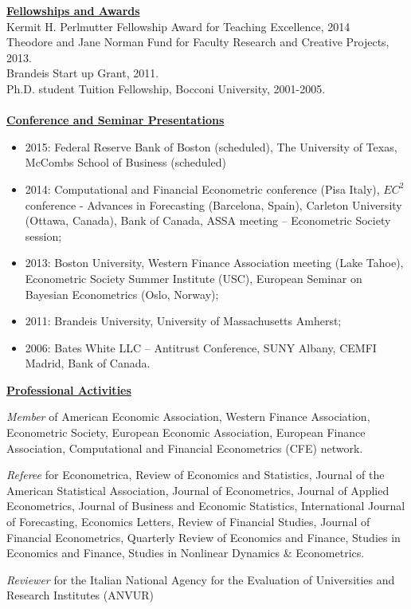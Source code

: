 \documentclass[12pt]{article}
\begin{document}
\underline{\textbf{Fellowships and Awards}}\\
Kermit H. Perlmutter Fellowship Award for Teaching Excellence, 2014 \\
Theodore and Jane Norman Fund for Faculty Research and Creative Projects, 2013. \\
Brandeis Start up Grant, 2011. \\
Ph.D. student Tuition Fellowship, Bocconi University, 2001-2005.\\ \\
\underline{\textbf{Conference and Seminar Presentations}}
\begin{itemize}
  \item 2015: Federal Reserve Bank of Boston (scheduled), The University of Texas, McCombs School of Business (scheduled)
	\item 2014: Computational and Financial Econometric conference (Pisa Italy), $EC^2$ conference - Advances in Forecasting (Barcelona, Spain),  Carleton University (Ottawa, Canada), Bank of Canada, ASSA meeting -- Econometric Society session;  
	\item 2013: Boston University, Western Finance Association meeting (Lake Tahoe), Econometric Society Summer Institute (USC), European Seminar on Bayesian Econometrics (Oslo, Norway); 
	\item 2011: Brandeis University, University of Massachusetts Amherst; 
	\item 2006: Bates White LLC -- Antitrust Conference, SUNY Albany, CEMFI Madrid, Bank of Canada.
\end{itemize}

\underline{\textbf{Professional Activities}}
\begin{description}
\item\emph{Member} of American Economic Association, Western Finance Association, Econometric Society, European Economic Association, European Finance Association, Computational and Financial Econometrics (CFE) network.

\item \emph{Referee} for Econometrica, Review of Economics and Statistics, Journal of the American Statistical Association, Journal of Econometrics, Journal of Applied Econometrics, Journal of Business and Economic Statistics, International Journal of Forecasting, Economics Letters, Review of Financial Studies, Journal of Financial Econometrics, Quarterly Review of Economics and Finance, Studies in Economics and Finance, Studies in Nonlinear Dynamics & Econometrics.

\item \emph{Reviewer} for the Italian National Agency for the Evaluation of Universities and Research Institutes (ANVUR) 
\end{description}
 
\end{document}
